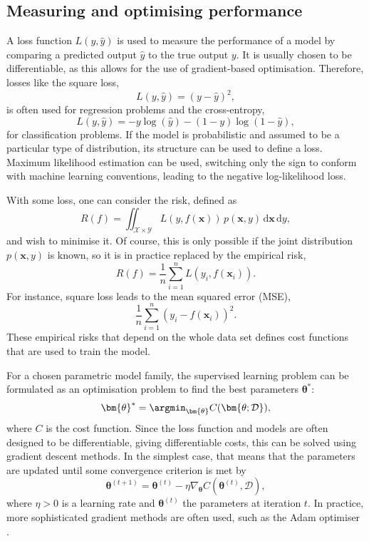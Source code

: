 \subsection{Measuring and optimising performance}
A loss function $L(y, \hat{y})$ is used to measure the performance of a model by comparing a predicted output $\hat{y}$ to the true output $y$.
It is usually chosen to be differentiable, as this allows for the use of gradient-based optimisation.
Therefore, losses like the square loss,
\begin{equation}
    L(y, \hat{y}) = (y - \hat{y})^2,
\end{equation}
is often used for regression problems and the cross-entropy,
\begin{equation}
    L(y, \hat{y}) = -y\log(\hat{y}) - (1-y)\log(1-\hat{y}),
\end{equation}
for classification problems.
If the model is probabilistic and assumed to be a particular type of distribution, its structure can be used to define a loss.
Maximum likelihood estimation can be used, switching only the sign to conform with machine learning conventions, leading to the negative log-likelihood loss.

With some loss, one can consider the risk, defined as
\begin{equation}
    R(f) = \iint_{\mathcal{X}\times\mathcal{Y}} L(y, f(\bm{x})) \, p(\bm{x}, y) \, \mathrm{d}\bm{x} \, \mathrm{d}y,
    \label{eq:risk}
\end{equation}
and wish to minimise it.
Of course, this is only possible if the joint distribution $p(\bm{x}, y)$ is known, so it is in practice replaced by the empirical risk,
\begin{equation}
    R(f) = \frac{1}{n} \sum_{i=1}^n L(y_i, f(\bm{x}_i)).
    \label{eq:empirical_risk}
\end{equation}
For instance, square loss leads to the mean squared error (MSE),
\begin{equation}
    \frac{1}{n} \sum_{i=1}^n (y_i - f(\bm{x}_i))^2.
\end{equation}
These empirical risks that depend on the whole data set defines cost functions that are used to train the model.

For a chosen parametric model family, the supervised learning problem can be formulated as an optimisation problem to find the best parameters $\bm{\theta}^*$:
\begin{equation}
    \bm{\theta}^* = \argmin_{\bm{\theta}} C(\bm{\theta; \mathcal{D}}),
\end{equation}
where $C$ is the cost function.
Since the loss function and models are often designed to be differentiable, giving differentiable costs, this can be solved using gradient descent methods.
In the simplest case, that means that the parameters are updated until some convergence criterion is met by
\begin{equation}
    \bm{\theta}^{(t+1)} = \bm{\theta}^{(t)} - \eta \nabla_{\bm{\theta}} C(\bm{\theta}^{(t)}, \mathcal{D}),
\end{equation}
where $\eta>0$ is a learning rate and $\bm{\theta}^{(t)}$ the parameters at iteration $t$.
In practice, more sophisticated gradient methods are often used, such as the Adam optimiser \cite{adamoptimiser}.

